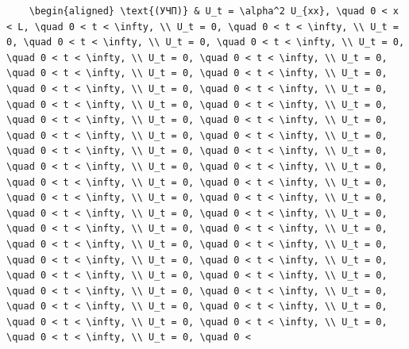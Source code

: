\documentclass[
  ukrainian,
]{article}
\begin{document}
\begin{verbatim}
    \begin{aligned} \text{(УЧП)} & U_t = \alpha^2 U_{xx}, \quad 0 < x < L, \quad 0 < t < \infty, \\ U_t = 0, \quad 0 < t < \infty, \\ U_t = 0, \quad 0 < t < \infty, \\ U_t = 0, \quad 0 < t < \infty, \\ U_t = 0, \quad 0 < t < \infty, \\ U_t = 0, \quad 0 < t < \infty, \\ U_t = 0, \quad 0 < t < \infty, \\ U_t = 0, \quad 0 < t < \infty, \\ U_t = 0, \quad 0 < t < \infty, \\ U_t = 0, \quad 0 < t < \infty, \\ U_t = 0, \quad 0 < t < \infty, \\ U_t = 0, \quad 0 < t < \infty, \\ U_t = 0, \quad 0 < t < \infty, \\ U_t = 0, \quad 0 < t < \infty, \\ U_t = 0, \quad 0 < t < \infty, \\ U_t = 0, \quad 0 < t < \infty, \\ U_t = 0, \quad 0 < t < \infty, \\ U_t = 0, \quad 0 < t < \infty, \\ U_t = 0, \quad 0 < t < \infty, \\ U_t = 0, \quad 0 < t < \infty, \\ U_t = 0, \quad 0 < t < \infty, \\ U_t = 0, \quad 0 < t < \infty, \\ U_t = 0, \quad 0 < t < \infty, \\ U_t = 0, \quad 0 < t < \infty, \\ U_t = 0, \quad 0 < t < \infty, \\ U_t = 0, \quad 0 < t < \infty, \\ U_t = 0, \quad 0 < t < \infty, \\ U_t = 0, \quad 0 < t < \infty, \\ U_t = 0, \quad 0 < t < \infty, \\ U_t = 0, \quad 0 < t < \infty, \\ U_t = 0, \quad 0 < t < \infty, \\ U_t = 0, \quad 0 < t < \infty, \\ U_t = 0, \quad 0 < t < \infty, \\ U_t = 0, \quad 0 < t < \infty, \\ U_t = 0, \quad 0 < t < \infty, \\ U_t = 0, \quad 0 < t < \infty, \\ U_t = 0, \quad 0 < t < \infty, \\ U_t = 0, \quad 0 < t < \infty, \\ U_t = 0, \quad 0 < t < \infty, \\ U_t = 0, \quad 0 < t < \infty, \\ U_t = 0, \quad 0 < t < \infty, \\ U_t = 0, \quad 0 < 
\end{verbatim}
\end{document}
